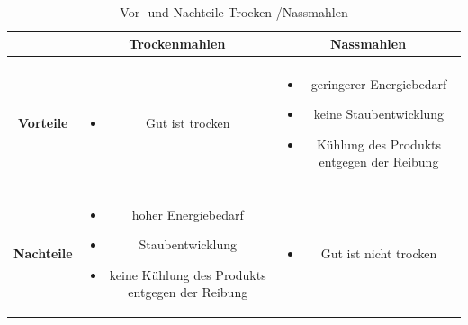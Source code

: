 \vspace*{-2.5mm}
\renewcommand{\arraystretch}{1.2}
\begin{table}[h!]
	\centering
	\caption{Vor- und Nachteile Trocken-/Nassmahlen}
	\begin{tabulary}{20cm}{C|C|C}
		\hline
		&\textbf{Trockenmahlen}  &\textbf{Nassmahlen} \\ 
		\hline
		&&\\
		\textbf{Vorteile}&\begin{minipage}[t]{0.4\textwidth}
			\begin{itemize}
				\item Gut ist trocken
			\end{itemize}
		\end{minipage} & 
		\begin{minipage}[t]{0.4\textwidth}
			\begin{itemize}
				\item geringerer Energiebedarf
				\item keine Staubentwicklung
				\item Kühlung des Produkts entgegen der Reibung 
			\end{itemize}
		\end{minipage}\\
	\hline
	&&\\
	\textbf{Nachteile} &\begin{minipage}[t]{0.4\textwidth}
		\begin{itemize}
			\item hoher Energiebedarf
			\item Staubentwicklung
			\item keine Kühlung des Produkts entgegen der Reibung
		\end{itemize}
	\end{minipage}&\begin{minipage}[t]{0.4\textwidth}
	\begin{itemize}
		\item Gut ist nicht trocken
	\end{itemize}
\end{minipage}\\
	\end{tabulary}
\end{table}
\FloatBarrier
\vspace*{-2.5mm}

